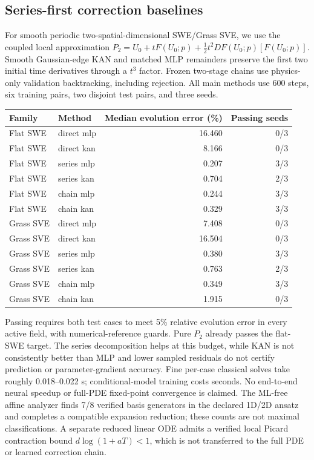 \subsection{Series-first correction baselines}
For smooth periodic two-spatial-dimensional SWE/Grass SVE, we use the coupled
local approximation $P_2=U_0+tF(U_0;p)+\tfrac12t^2DF(U_0;p)[F(U_0;p)]$.
Smooth Gaussian-edge KAN and matched MLP remainders preserve the first two
initial time derivatives through a $t^3$ factor. Frozen two-stage chains use
physics-only validation backtracking, including rejection. All main methods
use 600 steps, six training pairs, two disjoint test pairs, and three seeds.
\begin{center}\begin{tabular}{llrr}
Family & Method & Median evolution error (\%) & Passing seeds\\
\hline
Flat SWE & direct mlp & 16.460 & 0/3\\
Flat SWE & direct kan & 8.166 & 0/3\\
Flat SWE & series mlp & 0.207 & 3/3\\
Flat SWE & series kan & 0.704 & 2/3\\
Flat SWE & chain mlp & 0.244 & 3/3\\
Flat SWE & chain kan & 0.329 & 3/3\\
Grass SVE & direct mlp & 7.408 & 0/3\\
Grass SVE & direct kan & 16.504 & 0/3\\
Grass SVE & series mlp & 0.380 & 3/3\\
Grass SVE & series kan & 0.763 & 2/3\\
Grass SVE & chain mlp & 0.349 & 3/3\\
Grass SVE & chain kan & 1.915 & 0/3\\
\end{tabular}\end{center}
Passing requires both test cases to meet 5\% relative evolution error in every
active field, with numerical-reference guards. Pure $P_2$ already passes the
flat-SWE target. The series decomposition helps at this budget, while KAN is
not consistently better than MLP and lower sampled residuals do not certify
prediction or parameter-gradient accuracy. Fine per-case classical solves
take roughly 0.018--0.022 s; conditional-model training costs seconds.
No end-to-end neural speedup or full-PDE fixed-point convergence is claimed.
The ML-free affine analyzer finds 7/8 verified basis generators in the declared
1D/2D ansatz and completes a compatible expansion reduction; these counts are
not maximal classifications. A separate reduced linear ODE admits a verified
local Picard contraction bound $d\log(1+aT)<1$, which is not transferred to the
full PDE or learned correction chain.
